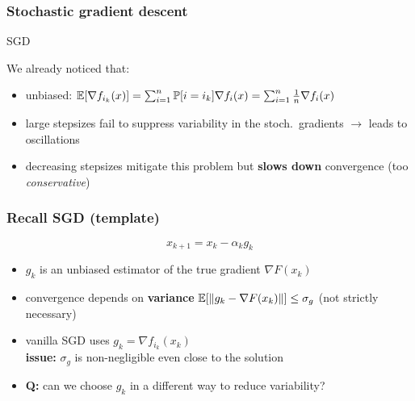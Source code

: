 \documentclass{beamer}
\begin{document}
\begin{frame}
  \frametitle{Stochastic gradient descent}
  \begin{algorithm}[H]
    \caption{SGD}\label{sgd}
    \begin{algorithmic}[1]
      \EndFor{}
    \end{algorithmic}
  \end{algorithm}

  We already noticed that:
  \begin{itemize}
    \item unbiased: $\mathbb{E}[\nabla f_{i_k}(x)] = \sum_{i=1}^{n} \mathbb{P}[i=i_k] \nabla f_i(x) = \sum_{i=1}^{n} \frac{1}{n} \nabla f_i(x)$
    \item large stepsizes fail to suppress variability in the stoch.\ gradients $\rightarrow$ leads to oscillations
    \item decreasing stepsizes mitigate this problem but \textbf{slows down} convergence (too \emph{conservative})
  \end{itemize}

\end{frame}


\begin{frame}
  \frametitle{Recall SGD (template)}
  \begin{equation}
    x_{k+1} = x_k - \alpha_k g_k
  \end{equation}
  \begin{itemize}
    \item $g_k$ is an unbiased estimator of the true gradient $\nabla F(x_k)$
    \item convergence depends on \textbf{variance} $\mathbb{E} [ \Vert g_k - \nabla F(x_k) \Vert ] \le \sigma_g$
          (not strictly necessary)
    \item vanilla SGD uses $g_k = \nabla f_{i_k}(x_k)$ \\
          \textbf{issue:} $\sigma_g$ is non-negligible even close to the solution
    \item \textbf{Q:} can we choose $g_k$ in a different way to reduce variability?
  \end{itemize}

\end{frame}
\end{document}
